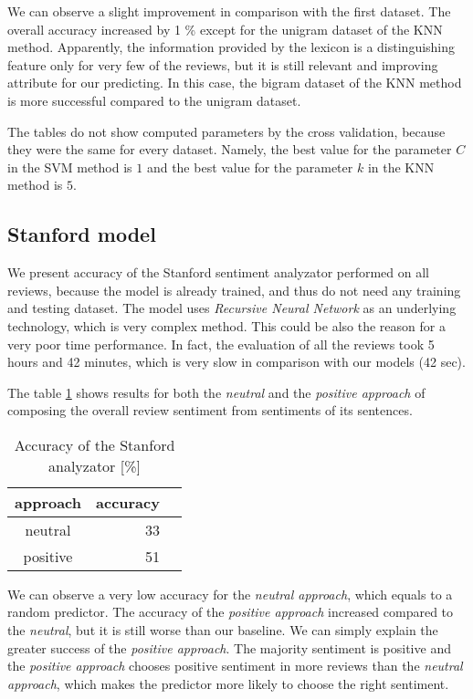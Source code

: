 \documentclass{sig-alternate}
\begin{document}
We can observe a slight improvement in comparison with the first dataset.
The overall accuracy increased by 1 \% except for the unigram dataset of the KNN method.
Apparently, the information provided by the lexicon is a distinguishing feature only for very few of the reviews, but it is still relevant and improving attribute for our predicting.
In this case, the bigram dataset of the KNN method is more successful compared to the unigram dataset.

The tables do not show computed parameters by the cross validation, because they were the same for every dataset.
Namely, the best value for the parameter $C$ in the SVM method is $1$ and the best value for the parameter $k$ in the KNN method is $5$.

\subsection{Stanford model}
We present accuracy of the Stanford sentiment analyzator performed on all reviews, because the model is already trained, and thus do not need any training and testing dataset.
The model uses {\it Recursive Neural Network} as an underlying technology, which is very complex method.
This could be also the reason for a very poor time performance.
In fact, the evaluation of all the reviews took 5 hours and 42 minutes, which is very slow in comparison with our models (42 sec).

The table \ref{stanford} shows results for both the {\it neutral} and the {\it positive approach} of composing the overall review sentiment from sentiments of its sentences.

\begin{table}[h]
\centering
\caption{Accuracy of the Stanford analyzator [\%]}
\label{stanford}
\begin{tabular}{|c|r|r|} \hline
approach & accuracy  \\ \hline
neutral & 33 \\ \hline
positive & 51 \\ \hline
\end{tabular}
\end{table}

We can observe a very low accuracy for the {\it neutral approach}, which equals to a random predictor.
The accuracy of the {\it positive approach} increased compared to the {\it neutral}, but it is still worse than our baseline.
We can simply explain the greater success of the {\it positive approach}.
The majority sentiment is positive and the {\it positive approach} chooses positive sentiment in more reviews than the {\it neutral approach}, which makes the predictor more likely to choose the right sentiment.
\end{document}
